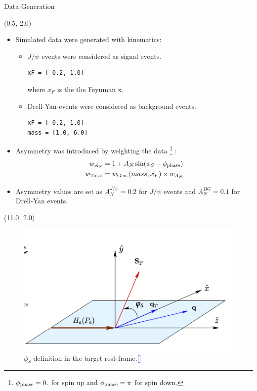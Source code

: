 \documentclass[11pt, xcolor={dvipsnames}, aspectratio = 169]{beamer}
\newcommand{\citeme}[1]{{\tiny \textcolor{blue}{[\fullcite{#1}]}}}
\newcommand{\jpsi}{$J/\psi$ }
\begin{document}
\begin{frame}[fragile]{Data Generation}

\begin{textblock}{14.0}(0.5, 2.0)

\begin{itemize}

\item Simulated data were generated with kinematics:

\begin{itemize}
\item \jpsi events were considered as signal events.

\begin{verbatim}
xF = [-0.2, 1.0]
\end{verbatim}
where $x_{F}$ is the the Feynman x.

\item Drell-Yan events were considered as background events.
\begin{verbatim}
xF = [-0.2, 1.0]
mass = [1.0, 6.0]
\end{verbatim}
\end{itemize}

\item Asymmetry was introduced by weighting the data \footnote{\tiny $\phi_{\rm phase} = 0.$ for spin up and $\phi_{\rm phase} = \pi$ for spin down.} :
\begin{align*}
w_{A_{N}} &= 1 + A_{N} \sin(\phi_{S} - \phi_{\rm phase})\\
w_{\text{Total}} &= w_{\text{Gen.}}(mass, x_{F}) \times w_{A_{N}}
\end{align*}

\item Asymmetry values are set as $A_{N}^{J/\psi} = 0.2$ for \jpsi events and $A_{N}^{BG} = 0.1$ for Drell-Yan events.

\end{itemize}
\end{textblock}

\begin{textblock}{5.0}(11.0, 2.0)
\begin{figure}
    \centering
    \includegraphics[width = 5.0 cm]{imgs/phi_angle.png}
    \caption{$\phi_{S}$ definition in the target rest frame.\citeme{Longo:2017snu}}
\end{figure}
\end{textblock}

\end{frame}
\end{document}
